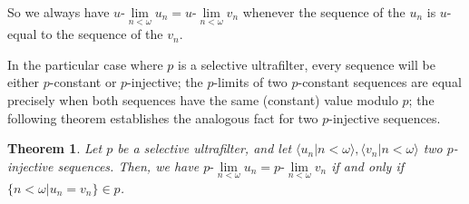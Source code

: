 \documentclass[10pt]{amsart}
\newcommand{\ulim}[2]{#1\text{-}\lim\limits_{#2<\omega}}
\newtheorem{theorem}{Theorem}[section]
\theoremstyle{definition}
\theoremstyle{remark}
\begin{document}
So we always have $\ulim{u}{n}u_n=\ulim{u}{n}v_n$ whenever the sequence of the $u_n$ is $u$-equal to the sequence of the $v_n$.

In the particular case where $p$ is a selective ultrafilter, every sequence will be either $p$-constant or $p$-injective; the $p$-limits of two $p$-constant sequences are equal precisely when both sequences have the same (constant) value modulo $p$; the following theorem establishes the analogous fact for two $p$-injective sequences.

\begin{theorem}\label{thm:uniquenessofsequence}
Let $p$ be a selective ultrafilter, and let $\langle u_n\big|n<\omega\rangle,\langle v_n\big|n<\omega\rangle$ two $p$-injective sequences. Then, we have $\ulim{p}{n}u_n=\ulim{p}{n}v_n$ if and only if $\{n<\omega\big|u_n=v_n\}\in p$.
\end{theorem}
\end{document}
